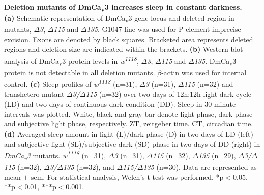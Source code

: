 \label{fig:S2}
\textbf{Deletion mutants of DmCa\textsubscript{v}3 increases sleep in constant darkness.}
\\
\textbf{(a)} Schematic representation of DmCa\textsubscript{v}3 gene locus and deleted region in mutants, \emph{$\Delta$3}, \emph{$\Delta$115} and \emph{$\Delta$135}.
G1047 line was used for P-element imprecise excision.
Exons are denoted by black squares.
Bracketed area represents deleted regions and deletion size are indicated within the brackets.
\textbf{(b)} Western blot analysis of DmCa\textsubscript{v}3 protein levels in \emph{w\textsuperscript{1118}}, \emph{$\Delta$3}, \emph{$\Delta$115} and \emph{$\Delta$135}.
DmCa\textsubscript{v}3 protein is not detectable in all deletion mutants.
$\beta$-actin was used for internal control.
\textbf{(c)} Sleep profiles of \emph{w\textsuperscript{1118}} (n=31), \emph{$\Delta$3} (n=31), \emph{$\Delta$115} (n=32) and transhetero mutant \emph{$\Delta$3/$\Delta$115} (n=32) over two days of 12h:12h light-dark cycle (LD) and two days of continuous dark condition (DD).
Sleep in 30 minute intervals was plotted.
White, black and gray bar denote light phase, dark phase and subjective light phase, respectively.
ZT, zeitgeber time.
CT, circadian time.
\textbf{(d)} Averaged sleep amount in light (L)/dark phase (D) in two days of LD (left) and subjective light (SL)/subjective dark (SD) phase in two days of DD (right) in \emph{DmCa\textsubscript{v}3} mutants.
\emph{w\textsuperscript{1118}} (n=31), \emph{$\Delta$3} (n=31), \emph{$\Delta$115} (n=32), \emph{$\Delta$135} (n=29), \emph{$\Delta$3/$\Delta$115} (n=32), \emph{$\Delta$3/$\Delta$135} (n=32), and \emph{$\Delta$115/$\Delta$135} (n=30).
Data are represented as mean $\pm$ sem.
For statistical analysis, Welch's t-test was performed.
*p$<$0.05, **p$<$0.01, ***p$<$0.001.
  
  